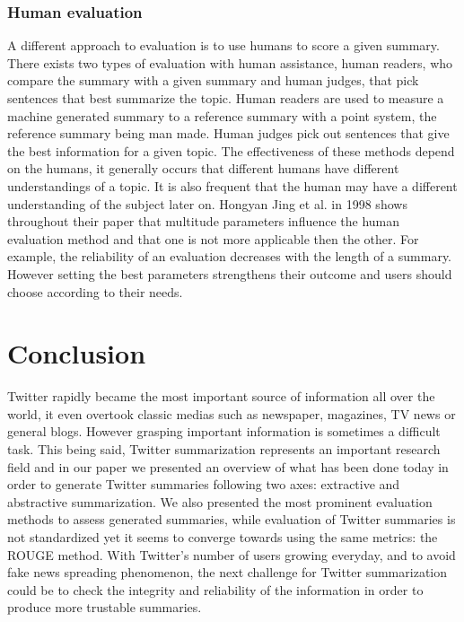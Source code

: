 \documentclass{llncs}
\begin{document}
\subsubsection{Human evaluation}

A different approach to evaluation is to use humans to score a given summary.
There exists two types of evaluation with human assistance, human readers, who
compare the summary with a given summary and human judges, that pick sentences
that best summarize the topic.  Human readers are used to measure a machine
generated summary to a reference summary with a point system, the reference
summary being man made. Human judges pick out sentences that give the best
information for a given topic. The effectiveness of these methods depend on the
humans, it generally occurs that different humans have different understandings
of a topic. It is also frequent that the human may have a different
understanding of the subject later on. Hongyan Jing et al. in 1998
\cite{jing_summarization_nodate} shows throughout their paper that multitude
parameters influence the human evaluation method and that one is not more
applicable then the other. For example, the reliability of an evaluation
decreases with the length of a summary. However setting the best parameters
strengthens their outcome and users should choose according to their needs.

\section{Conclusion}

Twitter rapidly became the most important source of information all over the
world, it even overtook classic medias such as newspaper, magazines, TV news or
general blogs. However grasping important information is sometimes a difficult
task. This being said, Twitter summarization represents an important research
field and in our paper we presented an overview of what has been done today in
order to generate Twitter summaries following two axes: extractive and
abstractive summarization. We also presented the most prominent evaluation
methods to assess generated summaries, while evaluation of Twitter summaries is
not standardized yet it seems to converge towards using the same metrics: the
ROUGE method. With Twitter's number of users growing everyday, and to avoid fake
news spreading phenomenon, the next challenge for Twitter summarization could
be to check the integrity and reliability of the information in order to
produce more trustable summaries.

\printbibliography
\end{document}

